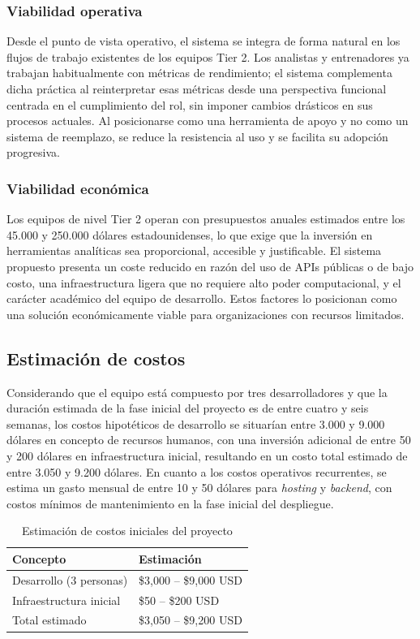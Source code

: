 \documentclass{ULBreport} %
\begin{document}
\subsubsection{Viabilidad operativa}

Desde el punto de vista operativo, el sistema se integra de forma natural en los flujos de trabajo existentes de los equipos Tier 2. Los analistas y entrenadores ya trabajan habitualmente con métricas de rendimiento; el sistema complementa dicha práctica al reinterpretar esas métricas desde una perspectiva funcional centrada en el cumplimiento del rol, sin imponer cambios drásticos en sus procesos actuales. Al posicionarse como una herramienta de apoyo y no como un sistema de reemplazo, se reduce la resistencia al uso y se facilita su adopción progresiva.

\subsubsection{Viabilidad económica}

Los equipos de nivel Tier 2 operan con presupuestos anuales estimados entre los 45.000 y 250.000 dólares estadounidenses, lo que exige que la inversión en herramientas analíticas sea proporcional, accesible y justificable. El sistema propuesto presenta un coste reducido en razón del uso de APIs públicas o de bajo costo, una infraestructura ligera que no requiere alto poder computacional, y el carácter académico del equipo de desarrollo. Estos factores lo posicionan como una solución económicamente viable para organizaciones con recursos limitados.

\subsection{Estimación de costos}

Considerando que el equipo está compuesto por tres desarrolladores y que la duración estimada de la fase inicial del proyecto es de entre cuatro y seis semanas, los costos hipotéticos de desarrollo se situarían entre 3.000 y 9.000 dólares en concepto de recursos humanos, con una inversión adicional de entre 50 y 200 dólares en infraestructura inicial, resultando en un costo total estimado de entre 3.050 y 9.200 dólares. En cuanto a los costos operativos recurrentes, se estima un gasto mensual de entre 10 y 50 dólares para \textit{hosting} y \textit{backend}, con costos mínimos de mantenimiento en la fase inicial del despliegue.

\begin{table}[H]
    \centering
    \caption{Estimación de costos iniciales del proyecto}
    \label{tab:costos}
    \begin{tabular}{|l|l|}
        \hline
        \textbf{Concepto} & \textbf{Estimación} \\ \hline
        Desarrollo (3 personas) & \$3,000 -- \$9,000 USD \\ \hline
        Infraestructura inicial & \$50 -- \$200 USD \\ \hline
        Total estimado & \$3,050 -- \$9,200 USD \\ \hline
    \end{tabular}
\end{table}
\end{document}
